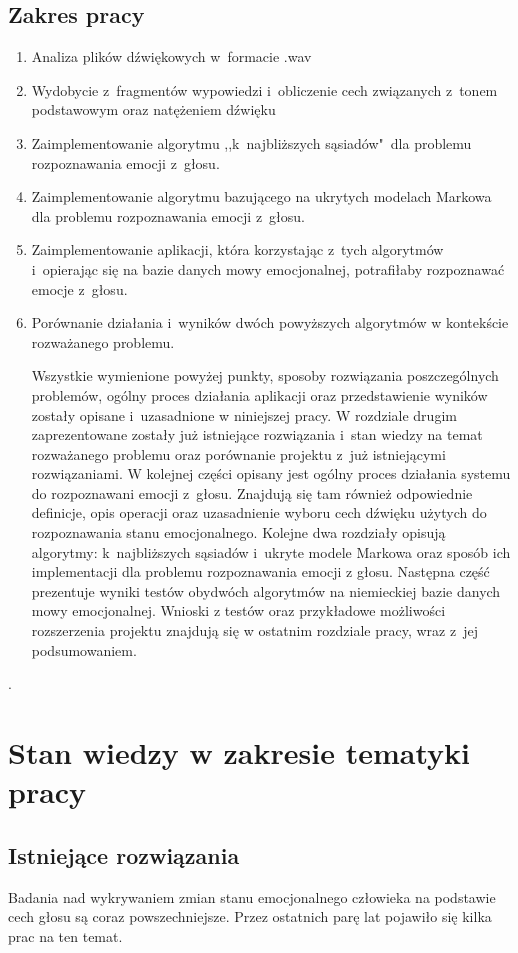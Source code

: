 \documentclass[declaration,shortabstract]{iithesis}
\begin{document}
\section{Zakres pracy}
\begin{enumerate}
\item Analiza plików dźwiękowych w~formacie .wav
\item Wydobycie z~fragmentów wypowiedzi i~obliczenie cech związanych z~tonem podstawowym oraz natężeniem dźwięku
\item Zaimplementowanie algorytmu ,,k~najbliższych sąsiadów"~dla problemu rozpoznawania emocji z~głosu.
\item Zaimplementowanie algorytmu bazującego na ukrytych modelach Markowa dla problemu rozpoznawania emocji z~głosu.
\item Zaimplementowanie aplikacji, która korzystając z~tych algorytmów i~opierając się na bazie danych mowy emocjonalnej, potrafiłaby rozpoznawać emocje z~głosu.
\item Porównanie działania i~wyników dwóch powyższych algorytmów w kontekście rozważanego problemu.

Wszystkie wymienione powyżej punkty, sposoby rozwiązania poszczególnych problemów, ogólny proces działania aplikacji oraz przedstawienie wyników zostały opisane i~uzasadnione w niniejszej pracy. W rozdziale drugim zaprezentowane zostały już istniejące rozwiązania i~stan wiedzy na temat rozważanego problemu oraz porównanie projektu z~już istniejącymi rozwiązaniami. W kolejnej części opisany jest ogólny proces działania systemu do rozpoznawani emocji z~głosu. Znajdują się tam również odpowiednie definicje, opis operacji oraz uzasadnienie wyboru cech dźwięku użytych do rozpoznawania stanu emocjonalnego. Kolejne dwa rozdziały opisują algorytmy: k~najbliższych sąsiadów i~ukryte modele Markowa oraz sposób ich implementacji dla problemu rozpoznawania emocji z głosu. Następna część prezentuje wyniki testów obydwóch algorytmów na niemieckiej bazie danych mowy emocjonalnej. Wnioski z testów oraz przykładowe możliwości rozszerzenia projektu znajdują się w ostatnim rozdziale pracy, wraz z~jej podsumowaniem.

\end{enumerate}.

\chapter{Stan wiedzy w zakresie tematyki pracy}
\section{Istniejące rozwiązania}
Badania nad wykrywaniem zmian stanu emocjonalnego człowieka na podstawie cech głosu są coraz powszechniejsze. Przez ostatnich parę lat pojawiło się kilka prac na ten temat. 
\end{document}
